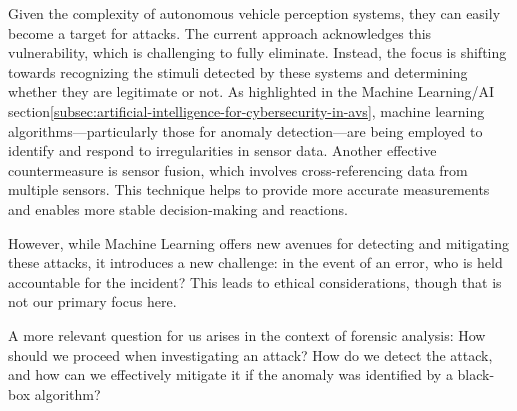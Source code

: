 Given the complexity of autonomous vehicle perception systems, they can easily become a target for attacks.
The current approach acknowledges this vulnerability, which is challenging to fully eliminate.
Instead, the focus is shifting towards recognizing the stimuli detected by these systems and determining whether they are legitimate or not.
As highlighted in the Machine Learning/AI section\ref{subsec:artificial-intelligence-for-cybersecurity-in-avs}, machine learning algorithms—particularly those for anomaly detection—are being employed to identify and respond to irregularities in sensor data.
Another effective countermeasure is sensor fusion, which involves cross-referencing data from multiple sensors.
This technique helps to provide more accurate measurements and enables more stable decision-making and reactions.

However, while Machine Learning offers new avenues for detecting and mitigating these attacks, it introduces a new challenge: in the event of an error, who is held accountable for the incident?
This leads to ethical considerations, though that is not our primary focus here.

A more relevant question for us arises in the context of forensic analysis: How should we proceed when investigating an attack?
How do we detect the attack, and how can we effectively mitigate it if the anomaly was identified by a black-box algorithm?\cite{cybersecurity2022forensics}
